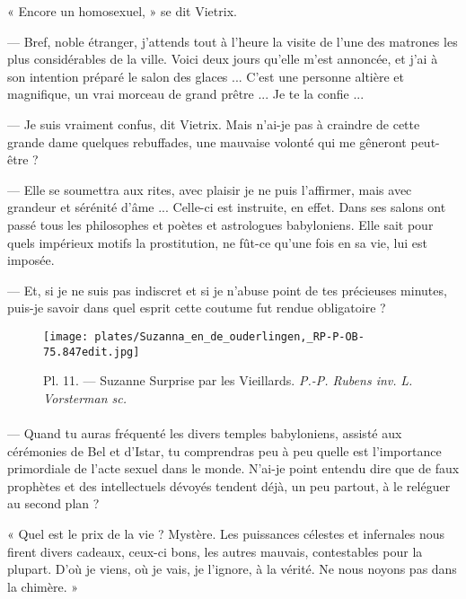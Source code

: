 \documentclass[a4paper, 11pt, oneside, polutonikogreek, french]{article}
\begin{document}
« Encore un homosexuel, » se dit Vietrix.

--- Bref, noble étranger, j'attends tout à l'heure la visite de l'une des matrones les plus considérables de la ville. Voici deux jours qu'elle m'est annoncée, et j'ai à son intention préparé le salon des glaces ... C'est une personne altière et magnifique, un vrai morceau de grand prêtre ... Je te la confie ...

--- Je suis vraiment confus, dit Vietrix. Mais n'ai-je pas à craindre de cette grande dame quelques rebuffades, une mauvaise volonté qui me gêneront peut-être ?

--- Elle se soumettra aux rites, avec plaisir je ne puis l'affirmer, mais avec grandeur et sérénité d'âme ... Celle-ci est instruite, en effet. Dans ses salons ont passé tous les philosophes et poètes et astrologues babyloniens. Elle sait pour quels impérieux motifs la prostitution, ne fût-ce qu'une fois en sa vie, lui est imposée.

--- Et, si je ne suis pas indiscret et si je n'abuse point de tes précieuses minutes, puis-je savoir dans quel esprit cette coutume fut rendue obligatoire ?

\bigskip
\centerline{\EightStarTaper}
\centerline{\EightStarTaper\EightStarTaper}
\bigskip
\clearpage
\vspace*{\fill}
\begin{figure}[H]
\centering
\texttt{[image: plates/Suzanna\_en\_de\_ouderlingen,\_RP-P-OB-75.847edit.jpg]}
\caption{\Fontauri Pl. 11. --- Suzanne Surprise par les Vieillards. \emph{P.-P. Rubens inv.} \emph{L. Vorsterman sc.}}
\end{figure}
\vspace*{\fill}
\clearpage
\paragraph{}
--- Quand tu auras fréquenté les divers temples babyloniens, assisté aux cérémonies de Bel et d'Istar, tu comprendras peu à peu quelle est l'importance primordiale de l'acte sexuel dans le monde. N'ai-je point entendu dire que de faux prophètes et des intellectuels dévoyés tendent déjà, un peu partout, à le reléguer au second plan ?

« Quel est le prix de la vie ? Mystère. Les puissances célestes et infernales nous firent divers cadeaux, ceux-ci bons, les autres mauvais, contestables pour la plupart. D'où je viens, où je vais, je l'ignore, à la vérité. Ne nous noyons pas dans la chimère. »
\end{document}
